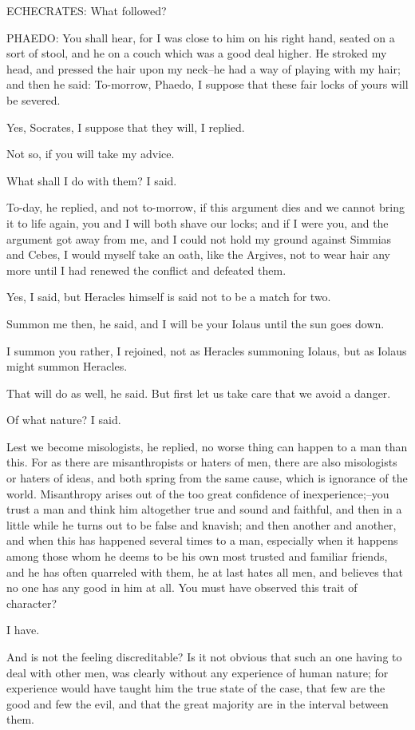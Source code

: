 ECHECRATES: What followed?

PHAEDO: You shall hear, for I was close to him on his right hand, seated
on a sort of stool, and he on a couch which was a good deal higher.
He stroked my head, and pressed the hair upon my neck--he had a way of
playing with my hair; and then he said: To-morrow, Phaedo, I suppose
that these fair locks of yours will be severed.

Yes, Socrates, I suppose that they will, I replied.

Not so, if you will take my advice.

What shall I do with them? I said.

To-day, he replied, and not to-morrow, if this argument dies and we
cannot bring it to life again, you and I will both shave our locks; and
if I were you, and the argument got away from me, and I could not hold
my ground against Simmias and Cebes, I would myself take an oath, like
the Argives, not to wear hair any more until I had renewed the conflict
and defeated them.

Yes, I said, but Heracles himself is said not to be a match for two.

Summon me then, he said, and I will be your Iolaus until the sun goes
down.

I summon you rather, I rejoined, not as Heracles summoning Iolaus, but
as Iolaus might summon Heracles.

That will do as well, he said. But first let us take care that we avoid
a danger.

Of what nature? I said.

Lest we become misologists, he replied, no worse thing can happen to a
man than this. For as there are misanthropists or haters of men, there
are also misologists or haters of ideas, and both spring from the same
cause, which is ignorance of the world. Misanthropy arises out of the
too great confidence of inexperience;--you trust a man and think him
altogether true and sound and faithful, and then in a little while he
turns out to be false and knavish; and then another and another, and
when this has happened several times to a man, especially when it
happens among those whom he deems to be his own most trusted and
familiar friends, and he has often quarreled with them, he at last hates
all men, and believes that no one has any good in him at all. You must
have observed this trait of character?

I have.

And is not the feeling discreditable? Is it not obvious that such an
one having to deal with other men, was clearly without any experience of
human nature; for experience would have taught him the true state of
the case, that few are the good and few the evil, and that the great
majority are in the interval between them.

